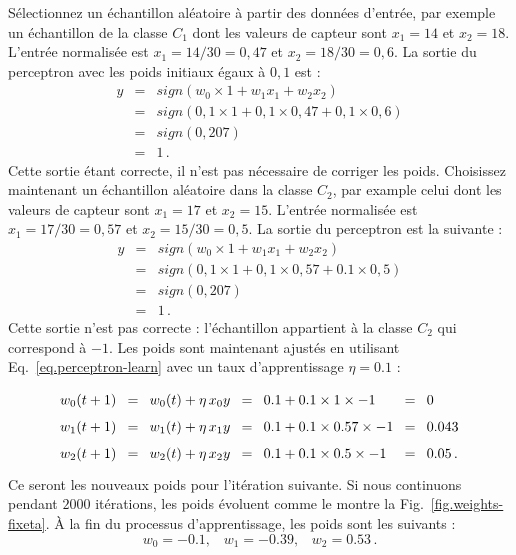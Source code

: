 Sélectionnez un échantillon aléatoire à partir des données d'entrée, par exemple un échantillon de la classe $C_1$ dont les valeurs de capteur sont $x_{1}=14$ et $x_{2}=18$. L'entrée normalisée est $x_{1}=14/30=0,47$ et $x_{2}=18/30=0,6$. La sortie du perceptron avec les poids initiaux égaux à $0,1$ est :
\begin{eqnarray*}
y &=& \mathit{sign}(w_0\times 1 + w_1x_1 + w_2x_2)\\
&=& \mathit{sign}(0,1\times 1 + 0,1\times 0,47 + 0,1\times 0,6)\\
&=& \mathit{sign}(0,207)\\
&=& 1\,.
\end{eqnarray*}
Cette sortie étant correcte, il n'est pas nécessaire de corriger les poids. Choisissez maintenant un échantillon aléatoire dans la classe $C_2$, par example celui dont les valeurs de capteur sont $x_{1}=17$ et $x_{2}=15$. L'entrée normalisée est $x_{1}=17/30=0,57$ et $x_{2}=15/30=0,5$. La sortie du perceptron est la suivante :
\begin{eqnarray*}
y &=& \mathit{sign}(w_0\times 1 + w_1x_1 + w_2x_2)\\
&=& \mathit{sign}(0,1\times 1 + 0,1\times 0,57 + 0.1\times 0,5)\\
&=& \mathit{sign}(0,207)\\
&=& 1\,.
\end{eqnarray*}
Cette sortie n'est pas correcte : l'échantillon appartient à la classe $C_2$ qui correspond à $-1$. Les poids sont maintenant ajustés en utilisant Eq.~\ref{eq.perceptron-learn} avec un taux d'apprentissage $\eta = 0.1$ :
\[
\spacearray
\begin{array}{lclclcl}
w_0(t+1) &=& w_0(t) + \eta \,x_0 y &=& 0.1 + 0.1\times 1\times -1 &=& 0 \\
w_1(t+1) &=& w_1(t) + \eta \,x_1 y &=& 0.1 + 0.1\times 0.57\times-1 &=& 0.043 \\
w_2(t+1) &=& w_2(t) + \eta \,x_2 y &=& 0.1 + 0.1\times 0.5\times -1 &=& 0.05\,.
\end{array}
\]
Ce seront les nouveaux poids pour l'itération suivante. Si nous continuons pendant $2000$ itérations, les poids évoluent comme le montre la Fig.~\ref{fig.weights-fixeta}. À la fin du processus d'apprentissage, les poids sont les suivants :
\[
w_0 = -0.1,\;\;\; w_1 = -0.39,\;\;\; w_2 = 0.53\,.
\]

